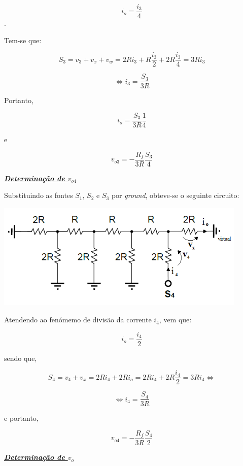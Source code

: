 \documentclass[a4paper,11pt]{report}
\begin{document}
$$i_o=\frac{i_3}{4}$$.

Tem-se que:

$$S_3=v_3+v_x+v_w=2Ri_3+R\frac{i_3}{2}+2R\frac{i_3}{4}=3Ri_3$$

$$\Leftrightarrow i_3=\frac{S_3}{3R}$$

Portanto,

$$i_o=\frac{S_3}{3R}\frac{1}{4}$$

e

\begin{equation}\label{eq:v03}
v_{o3}=-\frac{R_f}{3R}\frac{S_3}{4}
\end{equation}

\large\underline{{\textit{\textbf{Determinação de $v_{o4}$}}}}\\
\par

Substituindo as fontes $S_1$, $S_2$ e $S_3$ por \textit{ground}, obteve-se o seguinte circuito:


\begin{center}
     \includegraphics[angle=0,width=0.9\textwidth]{v04.png}
     \label{fig:v04}
     \end{center}

Atendendo ao fenómemo de divisão da corrente $i_4$, vem que:

$$i_o=\frac{i_4}{2}$$

sendo que,

$$S_4=v_4+v_x=2Ri_4+2Ri_o=2Ri_4+2R\frac{i_4}{2}=3Ri_4\Leftrightarrow$$

$$\Leftrightarrow i_4=\frac{S_4}{3R}$$

e portanto,

\begin{equation}\label{eq:v04}
v_{o4}=-\frac{R_f}{3R}\frac{S_4}{2}
\end{equation}


\large\underline{{\textit{\textbf{Determinação de $v_{o}$}}}}\\
\par
\end{document}

